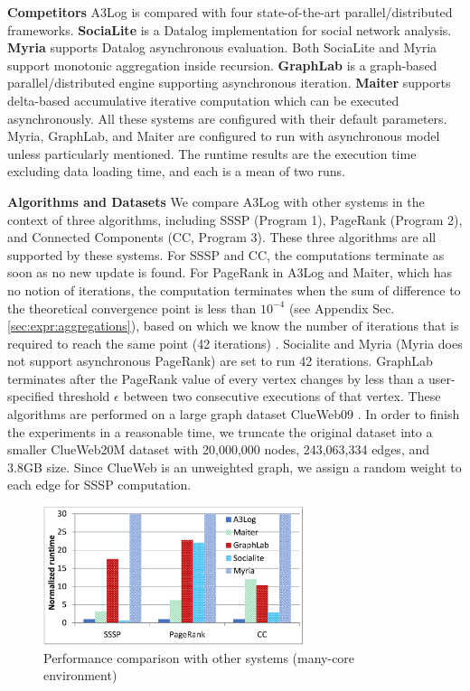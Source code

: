 \noindent\textbf{Competitors}
A3Log is compared with four state-of-the-art parallel/distributed frameworks. \textbf{SociaLite} \cite{Lam:2013:SDE:2510649.2511289,Seo:2013:DSD:2556549.2556572} is a Datalog implementation for social network analysis. \textbf{Myria} \cite{Halperin:2014:DMB:2588555.2594530,Wang:2015:AFR:2824032.2824052} supports Datalog asynchronous evaluation. Both SociaLite and Myria support monotonic aggregation inside recursion. \textbf{GraphLab} \cite{Low:2012:DGF:2212351.2212354} is a graph-based parallel/distributed engine supporting asynchronous iteration. \textbf{Maiter} \cite{maiter} supports delta-based accumulative iterative computation which can be executed asynchronously. All these systems are configured with their default parameters. Myria, GraphLab, and Maiter are configured to run with asynchronous model unless particularly mentioned. The runtime results are the execution time excluding data loading time, and each is a mean of two runs.

\noindent\textbf{Algorithms and Datasets}
We compare A3Log with other systems in the context of three algorithms, including SSSP (Program 1), PageRank (Program 2), and Connected Components (CC, Program 3). These three algorithms are all supported by these systems. For SSSP and CC, the computations terminate as soon as no new update is found. For PageRank in A3Log and Maiter, which has no notion of iterations, the computation terminates when the sum of difference to the theoretical convergence point \cite{Zhang:2011:PDF:2038916.2038929} is less than $10^{-4}$ (see Appendix Sec. \ref{sec:expr:aggregations}), based on which we know the number of iterations that is required to reach the same point (42 iterations) \cite{Zhang:2011:PDF:2038916.2038929}. Socialite and Myria (Myria does not support asynchronous PageRank) are set to run 42 iterations. GraphLab terminates after the PageRank value of every vertex changes by less than a user-specified threshold $\epsilon$ between two consecutive executions of that vertex. These algorithms are performed on a large graph dataset ClueWeb09 \cite{clueweb}. In order to finish the experiments in a reasonable time, we truncate the original dataset into a smaller ClueWeb20M dataset with 20,000,000 nodes, 243,063,334 edges, and 3.8GB size. Since ClueWeb is an unweighted graph, we assign a random weight to each edge for SSSP computation.

\begin{figure}[!t]
	\vspace{0.08in}
	\centering
	\includegraphics[width=3in]{fig/single-result}
	\vspace{-0.1in}
	\caption{Performance comparison with other systems (many-core environment)}
	\label{fig:single-result}
	\vspace{-0.2in}
\end{figure}

